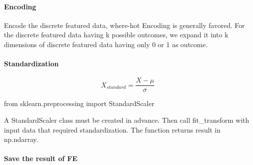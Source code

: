 \documentclass{article}
\begin{document}
	\paragraph{Encoding}
	Encode the discrete featured data, where-hot Encoding is generally favored. For the discrete featured data having k possible outcomes, we expand it into k dimensions of discrete featured data having only 0 or 1 as outcome.

	\paragraph{Standardization}
	\begin{displaymath}
		X_{standard} = \frac{X - \mu}{\sigma}
	\end{displaymath}

	from sklearn.preprocessing import StandardScaler

	A StandardScaler class must be created in advance. Then call fit\_transform with input data that required standardization. The function returns result in np.ndarray.

	\paragraph{Save the result of FE}
\end{document}
